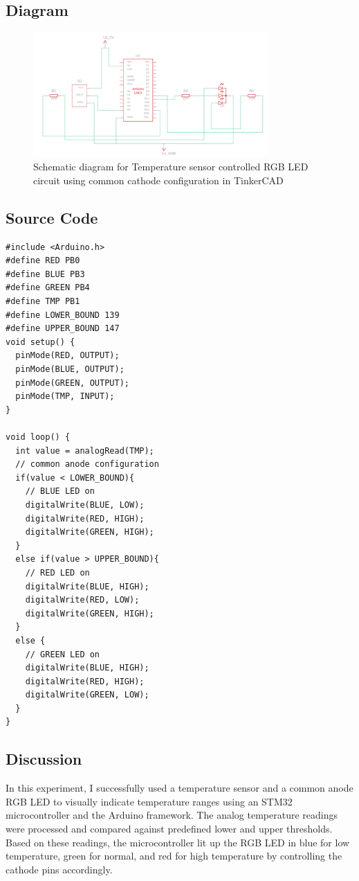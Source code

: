 \subsection{Diagram}
\begin{figure}[htbp]
    \centering
    \includegraphics[width=0.8\textwidth]{img/temp.png}
    \caption{Schematic diagram for Temperature sensor controlled RGB LED circuit using common cathode 
    configuration in TinkerCAD}\label{fig:temp}
\end{figure}
\subsection{Source Code}

\begin{code}
\caption{Temperature sensor}
\begin{verbatim}
#include <Arduino.h>
#define RED PB0
#define BLUE PB3
#define GREEN PB4
#define TMP PB1
#define LOWER_BOUND 139
#define UPPER_BOUND 147
void setup() {
  pinMode(RED, OUTPUT);
  pinMode(BLUE, OUTPUT);
  pinMode(GREEN, OUTPUT);
  pinMode(TMP, INPUT);
}

void loop() {
  int value = analogRead(TMP);
  // common anode configuration
  if(value < LOWER_BOUND){
    // BLUE LED on
    digitalWrite(BLUE, LOW);
    digitalWrite(RED, HIGH);
    digitalWrite(GREEN, HIGH);
  }
  else if(value > UPPER_BOUND){
    // RED LED on
    digitalWrite(BLUE, HIGH);
    digitalWrite(RED, LOW);
    digitalWrite(GREEN, HIGH);
  }
  else {
    // GREEN LED on
    digitalWrite(BLUE, HIGH);
    digitalWrite(RED, HIGH);
    digitalWrite(GREEN, LOW);
  }
}
\end{verbatim}
  \label{code:Tmp}
\end{code}

\subsection{Discussion}
In this experiment, I successfully used a temperature sensor
and a common anode RGB LED to visually indicate temperature ranges
using an STM32 microcontroller and the Arduino framework.
The analog temperature readings were processed and compared against
predefined lower and upper thresholds. Based on these readings,
the microcontroller lit up the RGB LED in blue for low temperature,
green for normal, and red for high temperature by controlling the cathode
pins accordingly.

